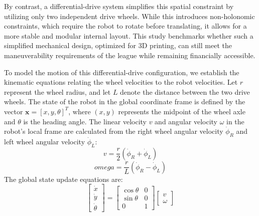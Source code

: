 \documentclass[a4paper,twoside,12pt]{report}
\begin{document}
By contrast, a differential-drive system simplifies this spatial constraint by utilizing only two independent drive wheels. While this introduces non-holonomic constraints, which require the robot to rotate before translating, it allows for a more stable and modular internal layout. This study benchmarks whether such a simplified mechanical design, optimized for 3D printing, can still meet the maneuverability requirements of the league while remaining financially accessible.

To model the motion of this differential-drive configuration, we establish the kinematic equations relating the wheel velocities to the robot velocities. Let $r$ represent the wheel radius, and let $L$ denote the distance between the two drive wheels. The state of the robot in the global coordinate frame is defined by the vector $\mathbf{x} = [x, y, \theta]^T$, where $(x, y)$ represents the midpoint of the wheel axle and $\theta$ is the heading angle. The linear velocity $v$ and angular velocity $\omega$ in the robot's local frame are calculated from the right wheel angular velocity $\dot{\phi}_R$ and left wheel angular velocity $\dot{\phi}_L$:
\begin{equation}
v = \frac{r}{2} (\dot{\phi}_R + \dot{\phi}_L)
\label{eq:linear_vel}
\end{equation}
\begin{equation}
omega = \frac{r}{L} (\dot{\phi}_R - \dot{\phi}_L)
\label{eq:angular_vel}
\end{equation}
The global state update equations are:
\begin{equation}
\begin{bmatrix}
\dot{x} \\
\dot{y} \\
\dot{\theta}
\end{bmatrix} = 
\begin{bmatrix}
\cos\theta & 0 \\
\sin\theta & 0 \\
0 & 1
\end{bmatrix}
\begin{bmatrix}
v \\
\omega
\end{bmatrix}
\label{eq:kinematics}
\end{equation}
\end{document}
